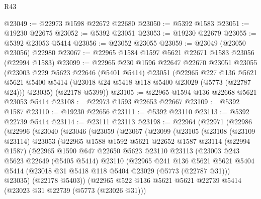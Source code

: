 \begin{lexlean}{R43}
\begin{coremodule}
@23049 := @22973 @1598 @22672 @22680
@23050 := @5392 @1583
@23051 := @19230 @22675
@23052 := @5392 @23051
@23053 := @19230 @22679
@23055 := @5392 @23053 @5414
@23056 := @23052 @23055
@23059 := @23049 (@23050 @23056) @22980
@23067 := @22965 @1584 @1597 @5621 @22671 @1583 @23056 (@22994 @1583)
@23099 := @22965
    @230
    @1596
    @22647
    @22670
    @23051
    @23055
    (@23003
      @229
      @5623
      @22646
      (@5401 @5414)
      @23051
      (@22965
        @227
        @136
        @5621
        @5621
        @5400
        @5414
        (@23018 @24 @5418 @118 @5400 @23029 (@5773 (@22787 @24)))
        @23035)
      (@22178 @5399))
@23105 := @22965 @1594 @136 @22668 @5621 @23053 @5414
@23108 := @22973 @1593 @22653 @22667
@23109 := @5392 @1587
@23110 := @19230 @22656
@23111 := @5392 @23110
@23113 := @5392 @22739 @5414
@23114 := @23111 @23113
@23198 := @22964
    (@22971
      (@22986
        (@22996
          (@23040
            (@23046
              (@23059
                (@23067
                  (@23099
                    (@23105
                      (@23108
                        (@23109 @23114)
                        @23053
                        (@22965
                          @1588
                          @1592
                          @5621
                          @22652
                          @1587
                          @23114
                          (@22994 @1587)
                          (@22965
                            @1590
                            @647
                            @22650
                            @5623
                            @23110
                            @23113
                            (@23003
                              @243
                              @5623
                              @22649
                              (@5405 @5414)
                              @23110
                              (@22965
                                @241
                                @136
                                @5621
                                @5621
                                @5404
                                @5414
                                (@23018 @31 @5418 @118 @5404 @23029 (@5773 (@22787 @31)))
                                @23035)
                              (@22178 @5403))
                            (@22965
                              @522
                              @136
                              @5621
                              @5621
                              @22739
                              @5414
                              (@23023 @31 @22739 (@5773 (@23026 @31)))

\end{coremodule}
\end{lexlean}
